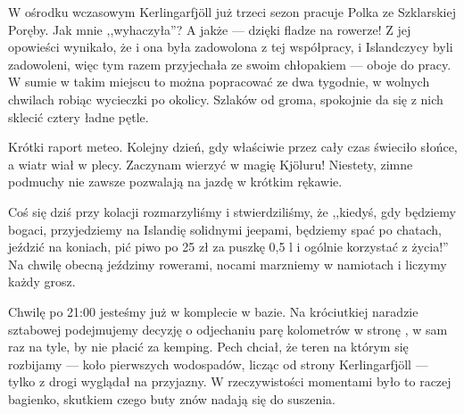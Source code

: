 W ośrodku wczasowym Kerlingarfjöll już trzeci sezon pracuje Polka ze Szklarskiej Poręby. Jak mnie ,,wyhaczyła''? A jakże --- dzięki fladze na rowerze! Z jej opowieści wynikało, że i ona była zadowolona z tej współpracy, i Islandczycy byli zadowoleni, więc tym razem przyjechała ze swoim chłopakiem --- oboje do pracy. W sumie w takim miejscu to można popracować ze dwa tygodnie, w wolnych chwilach robiąc wycieczki po okolicy. Szlaków od groma, spokojnie da się z nich sklecić cztery ładne pętle.


Krótki raport meteo. Kolejny dzień, gdy właściwie przez cały czas świeciło słońce, a wiatr wiał w plecy. Zaczynam wierzyć w magię Kjöluru! Niestety, zimne podmuchy nie zawsze pozwalają na jazdę w krótkim rękawie.

Coś się dziś przy kolacji rozmarzyliśmy i stwierdziliśmy, że ,,kiedyś, gdy będziemy bogaci, przyjedziemy na Islandię solidnymi jeepami, będziemy spać po chatach, jeździć na koniach, pić piwo po 25 zł za puszkę 0,5 l i ogólnie korzystać z życia!'' Na chwilę obecną jeździmy rowerami, nocami marzniemy w namiotach i liczymy każdy grosz.

Chwilę po 21:00 jesteśmy już w komplecie w bazie. Na króciutkiej naradzie sztabowej podejmujemy decyzję o odjechaniu parę kolometrów w stronę , w sam raz na tyle, by nie płacić za kemping. Pech chciał, że teren na którym się rozbijamy --- koło pierwszych wodospadów, licząc od strony Kerlingarfjöll --- tylko z drogi wyglądał na przyjazny. W rzeczywistości momentami było to raczej bagienko, skutkiem czego buty znów nadają się do suszenia.

